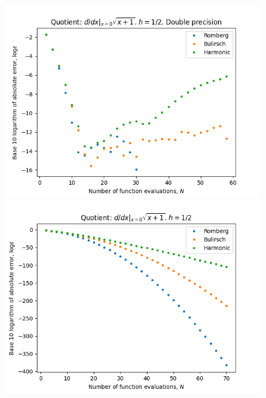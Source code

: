 \begin{figure}[H]
\centering
\begin{minipage}{0.45\textwidth}
\centering
\includegraphics[scale=0.45]{../results/diff_quot_plots/sqrt_1.png}
\end{minipage}
\begin{minipage}{0.45\textwidth}
\centering
\includegraphics[scale=0.45]{../results/diff_quot_plots/sqrt_1_hp.png}
\end{minipage}
\end{figure}

